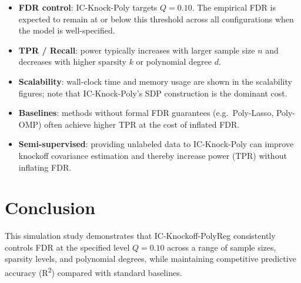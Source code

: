 \documentclass[12pt,a4paper]{article}
\begin{document}
\begin{itemize}
  \item \textbf{FDR control}: IC-Knock-Poly targets \(Q = 0.10\).
        The empirical FDR is expected to remain at or below this threshold
        across all configurations when the model is well-specified.
  \item \textbf{TPR / Recall}: power typically increases with larger
        sample size \(n\) and decreases with higher sparsity \(k\) or
        polynomial degree \(d\).
  \item \textbf{Scalability}: wall-clock time and memory usage are shown
        in the scalability figures; note that IC-Knock-Poly's SDP
        construction is the dominant cost.
  \item \textbf{Baselines}: methods without formal FDR guarantees (e.g.\
        Poly-Lasso, Poly-OMP) often achieve higher TPR at the cost of
        inflated FDR.
  \item \textbf{Semi-supervised}: providing unlabeled data to
        IC-Knock-Poly can improve knockoff covariance estimation and
        thereby increase power (TPR) without inflating FDR.
\end{itemize}

\section{Conclusion}
\label{sec:conclusion}

This simulation study demonstrates that IC-Knockoff-PolyReg consistently
controls FDR at the specified level \(Q = 0.10\) across a range of
sample sizes, sparsity levels, and polynomial degrees, while maintaining
competitive predictive accuracy (R\textsuperscript{2}) compared with
standard baselines.

\end{document}
